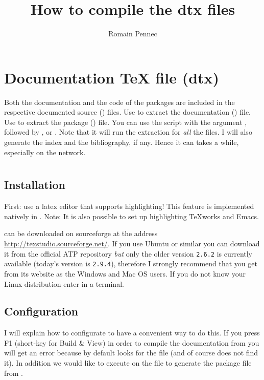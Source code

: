 \documentclass{AMdocumentation}
\title{How to compile the dtx files}
\author{Romain Pennec}
\begin{document}
\OLDmaketitle

\tableofcontents

\vskip1.7cm

\section{Documentation \TeX{} file (dtx)}

Both the documentation and the code of the packages are included in the respective documented source () files.
Use  to extract the documentation () file.
Use  to extract the package () file.
You can use the script  with the argument , followed by ,  or . Note that it will run the extraction for \emph{all} the  files. I will also generate the index and the bibliography, if any. Hence it can takes a while, especially on the network.


\section{\TeXstudio}

\subsection{Installation}

First: use a latex editor that supports  highlighting! This feature is implemented natively in \TeXstudio [recommanded]. Note: It is also possible to set up  highlighting TeXworks and Emacs.

\bigskip
\TeXstudio can be downloaded on sourceforge at the address \url{http://texstudio.sourceforge.net/}. 
If you use Ubuntu or similar you can download it from the official ATP repository \emph{but} only the older version \verb|2.6.2| is currently available (today's version is \verb!2.9.4!), therefore I strongly recommend that you get \TeXstudio from its website as the Windows and Mac OS users. If you do not know your Linux distribution enter  in a terminal.
\subsection{Configuration}

I will explain how to configurate \TeXstudio to have a convenient way to do this.
If you press F1 (short-key for Build \& View) in order to compile the documentation from   you will get an error because by default \TeXstudio looks for the file  (and of course does not find it). In addition we would like to execute  on the  file to generate the package file  from .
\end{document}
